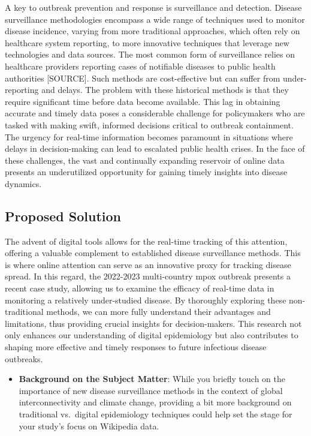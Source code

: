 \documentclass[
  12pt,
]{article}
\providecommand{\tightlist}{%
  \setlength{\itemsep}{0pt}\setlength{\parskip}{0pt}}\usepackage{longtable,booktabs,array}
\begin{document}
A key to outbreak prevention and response is surveillance and detection.
Disease surveillance methodologies encompass a wide range of techniques
used to monitor disease incidence, varying from more traditional
approaches, which often rely on healthcare system reporting, to more
innovative techniques that leverage new technologies and data sources.
The most common form of surveillance relies on healthcare providers
reporting cases of notifiable diseases to public health authorities
{[}SOURCE{]}. Such methods are cost-effective but can suffer from
under-reporting and delays. The problem with these historical methods is
that they require significant time before data become available. This
lag in obtaining accurate and timely data poses a considerable challenge
for policymakers who are tasked with making swift, informed decisions
critical to outbreak containment. The urgency for real-time information
becomes paramount in situations where delays in decision-making can lead
to escalated public health crises. In the face of these challenges, the
vast and continually expanding reservoir of online data presents an
underutilized opportunity for gaining timely insights into disease
dynamics.

\subsection{Proposed Solution}\label{proposed-solution}

The advent of digital tools allows for the real-time tracking of this
attention, offering a valuable complement to established disease
surveillance methods. This is where online attention can serve as an
innovative proxy for tracking disease spread. In this regard, the
2022-2023 multi-country mpox outbreak presents a recent case study,
allowing us to examine the efficacy of real-time data in monitoring a
relatively under-studied disease. By thoroughly exploring these
non-traditional methods, we can more fully understand their advantages
and limitations, thus providing crucial insights for decision-makers.
This research not only enhances our understanding of digital
epidemiology but also contributes to shaping more effective and timely
responses to future infectious disease outbreaks.

\begin{itemize}
\tightlist
\item
  \textbf{Background on the Subject Matter}: While you briefly touch on
  the importance of new disease surveillance methods in the context of
  global interconnectivity and climate change, providing a bit more
  background on traditional vs.~digital epidemiology techniques could
  help set the stage for your study's focus on Wikipedia data.
\end{itemize}
\end{document}
